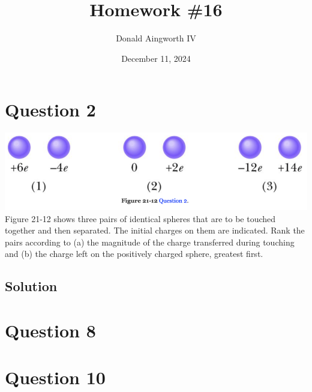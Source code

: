 \documentclass[12pt]{article}
\title{Homework \#16}
\author{Donald Aingworth IV}
\date{December 11, 2024}
\begin{document}

\maketitle

\pagebreak
\section{Question 2}
\includegraphics[width=\textwidth]{picture_1.png}
Figure 21-12 shows three pairs of identical spheres that are to be touched together and then separated. The initial charges on them are indicated. Rank the pairs according to (a) the magnitude of the charge transferred during touching and (b) the charge left on the positively charged sphere, greatest first.

\subsection{Solution}


\pagebreak
\section{Question 8}


\pagebreak
\section{Question 10}

\pagebreak
\end{document}
